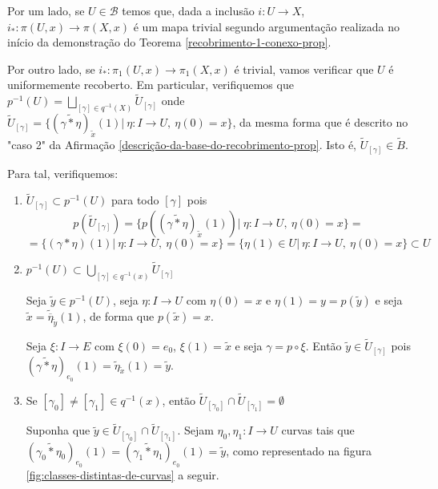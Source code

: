 \begin{dem}
    Por um lado, se $U\in \mathcal{B}$ temos que, dada a inclusão $i:U\rightarrow X$, $i_*:\pi(U,x)\rightarrow \pi(X,x)$ é um mapa trivial segundo argumentação realizada no início da demonstração do Teorema \ref{recobrimento-1-conexo-prop}.\newline

    Por outro lado, se $i_*:\pi_1(U,x)\rightarrow \pi_1(X,x)$ é trivial, vamos verificar que $U$ é uniformemente recoberto. Em particular, verifiquemos que $p^{-1}(U)=\underset{[\gamma]\in q^{-1}(X)}{\bigsqcup} \tilde{U}_{[\gamma]}$ onde $\tilde{U}_{[\gamma]}=\{(\widetilde{\gamma*\eta})_{\tilde{x}}(1)|~\eta:I\rightarrow U,~\eta(0)=x\}$, da mesma forma que é descrito no "caso 2" da Afirmação \ref{descrição-da-base-do-recobrimento-prop}. Isto é, $\tilde{U}_{[\gamma]}\in \tilde{B}$.

    Para tal, verifiquemos:

    \begin{enumerate}
        \item $\tilde{U}_{[\gamma]}\subset p^{-1}(U)$ para todo $[\gamma]$ pois
        $$p(\tilde{U}_{[\gamma]})=\{p((\widetilde{\gamma*\eta})_{\tilde{x}}(1))|~\eta:I\rightarrow U,~\eta(0)=x\}=$$$$=\{(\gamma*\eta)(1)|~\eta:I\rightarrow U,~\eta(0)=x\}=\{\eta(1)\in U|~\eta:I\rightarrow U,~\eta(0)=x\}\subset U$$\newline

        \item $p^{-1}(U)\subset \underset{[\gamma]\in q^{-1}(x)}{\bigcup} \tilde{U}_{[\gamma]}$

        Seja $\tilde{y}\in p^{-1}(U)$, seja $\eta:I\rightarrow U$ com $\eta(0)=x$ e $\eta(1)=y=p(\tilde{y})$ e seja $\tilde{x}=\tilde{\overline{\eta}}_{\tilde{y}}(1)$, de forma que $p(\tilde{x})=x$.

        Seja $ \xi:I\rightarrow E$ com $\xi(0)=e_0$, $\xi(1)=\tilde{x}$ e seja $\gamma=p\circ \xi$. Então $ \tilde{y}\in \tilde{U}_{[\gamma]}$ pois $(\widetilde{\gamma * \eta})_{e_0}(1)=\tilde{\eta}_{\tilde{x}}(1)=\tilde{y}$.\newline

        \item Se $[\gamma_0]\neq [\gamma_1]\in q^{-1}(x)$, então $ \tilde{U}_{[\gamma_0]}\cap \tilde{U}_{[\gamma_1]}=\emptyset$

        Suponha que $\tilde{y}\in \tilde{U}_{[\gamma_0]}\cap\tilde{U}_{[\gamma_1]}$. Sejam $\eta_0, \eta_1: I\rightarrow U$ curvas tais que $(\widetilde{\gamma_0*\eta_0})_{e_0}(1)=(\widetilde{\gamma_1*\eta_1})_{e_0}(1)=\tilde{y}$, como representado na figura \ref{fig:classes-distintas-de-curvas} a seguir.


\end{enumerate}
\end{dem}
